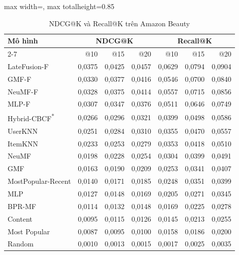 \begin{table}[H]
    \centering\small\setlength{\tabcolsep}{4pt}
    \caption{NDCG@K và Recall@K trên Amazon Beauty}
    \label{tab:amzk1}
    \begin{adjustbox}{max width=\textwidth, max totalheight=0.85\textheight}
    \begin{tabular}{|l|r|r|r|r|r|r|}
        \hline
        \multirow{2}{*}{Mô hình} & \multicolumn{3}{c|}{NDCG@K} & \multicolumn{3}{c|}{Recall@K} \\ \cline{2-7}
         & @10 & @15 & @20 & @10 & @15 & @20 \\ \hline
        LateFusion-F & 0{,}0375 & 0{,}0425 & 0{,}0457 & 0{,}0629 & 0{,}0794 & 0{,}0904 \\ \hline
        GMF-F & 0{,}0330 & 0{,}0377 & 0{,}0416 & 0{,}0546 & 0{,}0700 & 0{,}0840 \\ \hline
        NeuMF-F & 0{,}0328 & 0{,}0375 & 0{,}0414 & 0{,}0557 & 0{,}0715 & 0{,}0856 \\ \hline
        MLP-F & 0{,}0307 & 0{,}0347 & 0{,}0376 & 0{,}0511 & 0{,}0646 & 0{,}0749 \\ \hline
        Hybrid-CBCF\textsuperscript{*} & 0{,}0266 & 0{,}0296 & 0{,}0321 & 0{,}0399 & 0{,}0498 & 0{,}0586 \\ \hline
        UserKNN & 0{,}0251 & 0{,}0284 & 0{,}0310 & 0{,}0355 & 0{,}0470 & 0{,}0557 \\ \hline
        ItemKNN & 0{,}0233 & 0{,}0253 & 0{,}0279 & 0{,}0353 & 0{,}0418 & 0{,}0510 \\ \hline
        NeuMF & 0{,}0198 & 0{,}0228 & 0{,}0254 & 0{,}0304 & 0{,}0399 & 0{,}0491 \\ \hline
        GMF & 0{,}0163 & 0{,}0190 & 0{,}0209 & 0{,}0253 & 0{,}0341 & 0{,}0407 \\ \hline
        MostPopular-Recent & 0{,}0140 & 0{,}0171 & 0{,}0185 & 0{,}0248 & 0{,}0351 & 0{,}0399 \\ \hline
        MLP & 0{,}0127 & 0{,}0148 & 0{,}0169 & 0{,}0205 & 0{,}0271 & 0{,}0345 \\ \hline
        BPR-MF & 0{,}0114 & 0{,}0132 & 0{,}0148 & 0{,}0169 & 0{,}0225 & 0{,}0278 \\ \hline
        Content & 0{,}0095 & 0{,}0115 & 0{,}0126 & 0{,}0145 & 0{,}0213 & 0{,}0255 \\ \hline
        Most Popular & 0{,}0087 & 0{,}0095 & 0{,}0100 & 0{,}0158 & 0{,}0186 & 0{,}0200 \\ \hline
        Random & 0{,}0010 & 0{,}0013 & 0{,}0015 & 0{,}0017 & 0{,}0025 & 0{,}0035 \\ \hline
    \end{tabular}
    \end{adjustbox}
\end{table}
